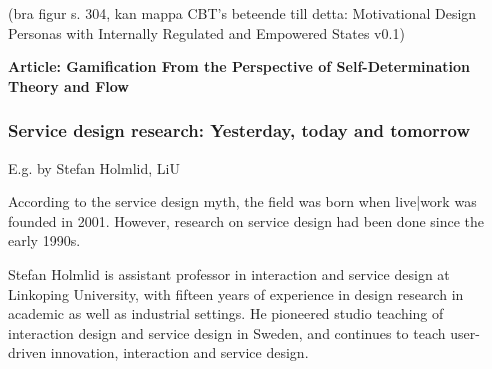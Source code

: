 (bra figur s. 304, kan mappa CBT's beteende till detta: Motivational Design Personas with Internally Regulated and Empowered States v0.1)

\textbf{Article: Gamification From the Perspective of Self-Determination Theory and Flow}

\subsubsection{Service design research: Yesterday, today and tomorrow}

E.g. by Stefan Holmlid, LiU

According to the service design myth, the field was born when live|work was founded in 2001. However, research on service design had been done since the early 1990s.


Stefan Holmlid is assistant professor in interaction and service design at Linkoping University, with fifteen years of experience in design research in academic as well as industrial settings. He pioneered studio teaching of interaction design and service design in Sweden, and continues to teach user-driven innovation, interaction and service design.
